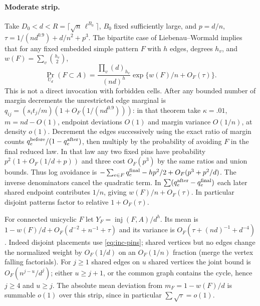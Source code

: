 \paragraph{Moderate strip.}
Take $D_0<d<R=\lceil\sqrt n\,\ell^{B_0}\rceil$, $B_0$ fixed sufficiently
large, and $p=d/n$, $\tau=1/(nd^{0.9})+d/n^2+p^3$.
The bipartite case of Liebenau--Wormald \cite[Theorem~1.4]{LW} implies that for any fixed embedded simple pattern $F$
with $h$ edges, degrees $h_v$, and $w(F)=\sum_v\binom{h_v}{2}$,
\[
 \Pr_{U_d}(F\subset A)
 =\frac{\prod_v(d)_{h_v}}{(nd)^h}\exp\{w(F)/n+O_F(\tau)\}.
 \tag{I1}\label{eq:inc-pins}
\]
This is not a direct invocation with forbidden cells. After any bounded
number of margin decrements the unrestricted edge marginal is
$q_{ij}=(s_i t_j/m)(1+O_F(1/(nd^{0.9})))$: in that theorem take
$\kappa=.01$, $m=nd-O(1)$, endpoint deviations $O(1)$ and margin
variance $O(1/n)$, at density $o(1)$. Decrement the edges successively
using the exact ratio of margin counts $q_e^{\rm before}/(1-q_e^{\rm after})$,
then multiply by the probability of avoiding $F$ in the final reduced
law. In that law any two fixed pins have probability
$p^2(1+O_F(1/d+p))$ and three cost $O_F(p^3)$ by the same ratios
and union bounds. Thus log avoidance is
$-\sum_{e\in F}q_e^{\rm final}-hp^2/2+O_F(p^3+p^2/d)$.
The inverse denominators cancel the quadratic term.
In $\sum(q_e^{\rm after}-q_e^{\rm final})$ each later shared endpoint
contributes $1/n$, giving $w(F)/n+O_F(\tau)$. In particular
disjoint patterns factor to relative $1+O_F(\tau)$.

For connected unicyclic $F$ let $Y_F=\operatorname{inj}(F,A)/d^h$.
Its mean is $1-w(F)/d+O_F(d^{-2}+n^{-1}+\tau)$ and its variance is
$O_F(\tau+(nd)^{-1}+d^{-4})$. Indeed disjoint placements use \eqref{eq:inc-pins};
shared vertices but no edges change the normalized weight by
$O_F(1/d)$ on an $O_F(1/n)$ fraction (merge the vertex falling
factorials). For $j\ge1$ shared edges on $u$ shared vertices the
joint bound is $O_F(n^{j-u}/d^j)$; either $u\ge j+1$, or the
common graph contains the cycle, hence $j\ge4$ and $u\ge j$.
The absolute mean deviation from $m_F=1-w(F)/d$ is summable $o(1)$
over this strip, since in particular $\sum\sqrt\tau=o(1)$.

